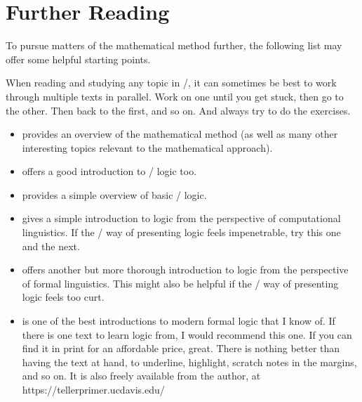 \documentclass[../../../main.tex]{subfiles}
\begin{document}
\chapter{Further Reading}

To pursue matters of the mathematical method further, the following list may offer some helpful starting points. 

When reading and studying any topic in \math/, it can sometimes be best to work through multiple texts in parallel. Work on one until you get stuck, then go to the other. Then back to the first, and so on. And always try to do the exercises.

\begin{itemize}

  \item \citet[chs.~1--2]{Wilder2012} provides an overview of the mathematical method (as well as many other interesting topics relevant to the mathematical approach).

  \item \citet{StewartAndTall2015} offers a good introduction to \mathical/ logic too.

  \item \citet{Devlin2012} provides a simple overview of basic \mathical/ logic.

  \item \citet[]{BlackburnAndBos2005} gives a simple introduction to logic from the perspective of computational linguistics. If the \mathical/ way of presenting logic feels impenetrable, try this one and the next.

  \item \citet[chs. 2--3]{DowtyEtAl1981} offers another but more thorough introduction to logic from the perspective of formal linguistics. This might also be helpful if the \mathical/ way of presenting logic feels too curt.
  
  \item \citet{Teller1989} is one of the best introductions to modern formal logic that I know of. If there is one text to learn logic from, I would recommend this one. If you can find it in print for an affordable price, great. There is nothing better than having the text at hand, to underline, highlight, scratch notes in the margins, and so on. It is also freely available from the author, at https://tellerprimer.ucdavis.edu/

\end{itemize}
\end{document}

